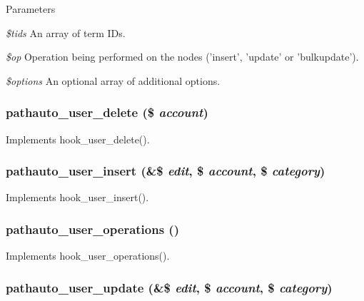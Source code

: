 \begin{DoxyParams}{Parameters}
\item[{\em \$tids}]An array of term IDs. \item[{\em \$op}]Operation being performed on the nodes ('insert', 'update' or 'bulkupdate'). \item[{\em \$options}]An optional array of additional options. \end{DoxyParams}
\hypertarget{pathauto_8module_a2ab8bcc3e1528ae3088dc9fef8ef55e8}{
\subsubsection[{pathauto\_\-user\_\-delete}]{\setlength{\rightskip}{0pt plus 5cm}pathauto\_\-user\_\-delete (\$ {\em account})}}
\label{pathauto_8module_a2ab8bcc3e1528ae3088dc9fef8ef55e8}
Implements hook\_\-user\_\-delete(). \hypertarget{pathauto_8module_afc367a3a7a9e84f3704b8baf5f3d73bc}{
\subsubsection[{pathauto\_\-user\_\-insert}]{\setlength{\rightskip}{0pt plus 5cm}pathauto\_\-user\_\-insert (\&\$ {\em edit}, \/  \$ {\em account}, \/  \$ {\em category})}}
\label{pathauto_8module_afc367a3a7a9e84f3704b8baf5f3d73bc}
Implements hook\_\-user\_\-insert(). \hypertarget{pathauto_8module_a0f247e28488c4fe7f4306c14add7a565}{
\subsubsection[{pathauto\_\-user\_\-operations}]{\setlength{\rightskip}{0pt plus 5cm}pathauto\_\-user\_\-operations ()}}
\label{pathauto_8module_a0f247e28488c4fe7f4306c14add7a565}
Implements hook\_\-user\_\-operations(). \hypertarget{pathauto_8module_ac2569a0defd03ecce4977acb75c6db3e}{
\subsubsection[{pathauto\_\-user\_\-update}]{\setlength{\rightskip}{0pt plus 5cm}pathauto\_\-user\_\-update (\&\$ {\em edit}, \/  \$ {\em account}, \/  \$ {\em category})}}
